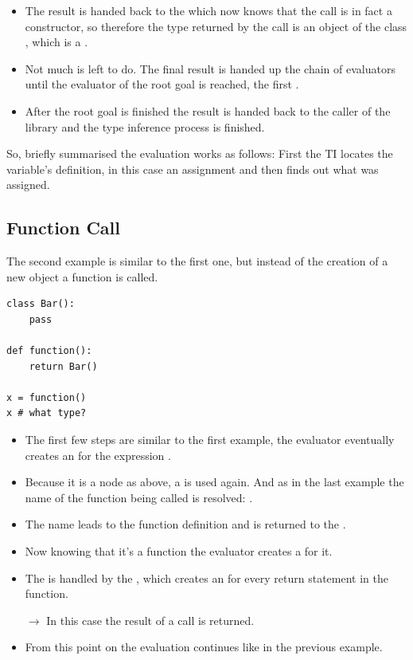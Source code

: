 \documentclass[12pt,halfparskip,DIV11,BCOR10mm]{scrreprt}
\begin{document}
\begin{itemize}
    \item The result is handed back to the  which now knows that the call is in fact a constructor, so therefore the type returned by the call is an object of the class , which is a .
    \item Not much is left to do. The final result is handed up the chain of evaluators until the evaluator of the root goal is reached, the first .
    \item After the root goal is finished the result is handed back to the caller of the library and the type inference process is finished.
\end{itemize}

So, briefly summarised the evaluation works as follows: First the TI locates the variable's definition, in this case an assignment and then finds out what was assigned.

\subsection{Function Call}

The second example is similar to the first one, but instead of the creation of a new object a function is called.

\begin{lstlisting}
class Bar():
    pass

def function():
    return Bar()

x = function()
x # what type?
\end{lstlisting}

\begin{itemize}
    \item The first few steps are similar to the first example, the evaluator eventually creates an  for the expression .
    \item Because it is a  node as above, a  is used again. And as in the last example the name of the function being called is resolved: .
    \item The name  leads to the function definition and is returned to the .
    \item Now knowing that it's a function the evaluator creates a  for it.
    \item The  is handled by the , which creates an  for every return statement in the function.
    \item[$\rightarrow$] In this case the result of a  call is returned.
    \item From this point on the evaluation continues like in the previous example.
\end{itemize}
\end{document}
